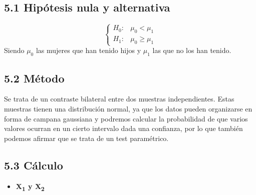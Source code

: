 \documentclass[
]{article}
\newenvironment{Shaded}{\begin{snugshade}}{\end{snugshade}}
\newcommand{\KeywordTok}[1]{\textcolor[rgb]{0.13,0.29,0.53}{\textbf{#1}}}
\newcommand{\NormalTok}[1]{#1}
\newcommand{\OperatorTok}[1]{\textcolor[rgb]{0.81,0.36,0.00}{\textbf{#1}}}
\newcommand{\StringTok}[1]{\textcolor[rgb]{0.31,0.60,0.02}{#1}}
\providecommand{\tightlist}{%
  \setlength{\itemsep}{0pt}\setlength{\parskip}{0pt}}
\begin{document}
\hypertarget{hipuxf3tesis-nula-y-alternativa-2}{%
\subsection{5.1 Hipótesis nula y
alternativa}\label{hipuxf3tesis-nula-y-alternativa-2}}

\[
\left\{
  \begin{array}{ll}
    H_{0}: &  \mu_{0} < \mu_{1}\\
    H_{1}: & \mu_{0} \ge \mu_{1}
  \end{array}
\right.
\] Siendo \(\mu_0\) las mujeres que han tenido hijos y \(\mu_1\) las que
no los han tenido.

\hypertarget{muxe9todo-2}{%
\subsection{5.2 Método}\label{muxe9todo-2}}

Se trata de un contraste bilateral entre dos muestras independientes.
Estas muestras tienen una distribución normal, ya que los datos pueden
organizarse en forma de campana gaussiana y podremos calcular la
probabilidad de que varios valores ocurran en un cierto intervalo dada
una confianza, por lo que también podemos afirmar que se trata de un
test paramétrico.

\hypertarget{cuxe1lculo}{%
\subsection{5.3 Cálculo}\label{cuxe1lculo}}

\begin{itemize}
\tightlist
\item
  \textbf{X\textsubscript{1} y X\textsubscript{2}}
\end{itemize}

\begin{Shaded}
\end{Shaded}
\end{document}
